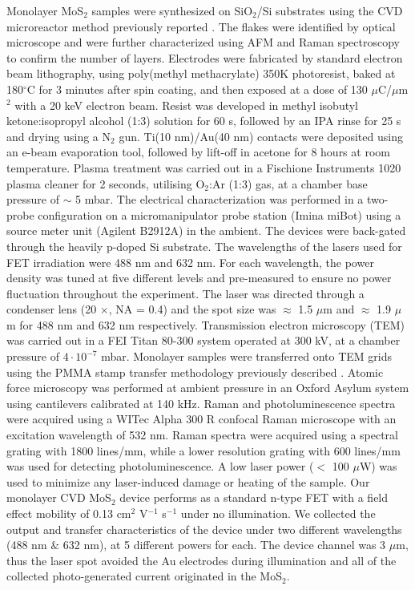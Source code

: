\documentclass[%
 reprint,
superscriptaddress,
 amsmath,amssymb,
 aps,
prb,
]{revtex4-1}
\begin{document}
\indent Monolayer MoS$_2$ samples were synthesized on SiO$_2$/Si substrates using the CVD microreactor method previously reported \cite{Maria2014}. The flakes were identified by optical microscope and were further characterized using AFM and Raman spectroscopy to confirm the number of layers. Electrodes were fabricated by standard electron beam lithography, using poly(methyl methacrylate) 350K photoresist, baked at 180$^{\circ}$C for 3 minutes after spin coating, and then exposed at a dose of 130 $\mu$C/$\mu$m$^2$ with a 20 keV electron beam. Resist was developed in methyl isobutyl ketone:isopropyl alcohol (1:3) solution for 60 s, followed by an IPA rinse for 25 s and drying using a N$_2$ gun. Ti(10 nm)/Au(40 nm) contacts were deposited using an e-beam evaporation tool, followed by lift-off in acetone for 8 hours at room temperature. Plasma treatment was carried out in a Fischione Instruments 1020 plasma cleaner for 2 seconds, utilising O$_2$:Ar (1:3) gas, at a chamber base pressure of $\sim$ 5 mbar. The electrical characterization was performed in a two-probe configuration on a micromanipulator probe station (Imina miBot) using a source meter unit (Agilent B2912A) in the ambient. The devices were back-gated through the heavily p-doped Si substrate. The wavelengths of the lasers used for FET irradiation were 488 nm and 632 nm. For each wavelength, the power density was tuned at five different levels and pre-measured to ensure no power fluctuation throughout the experiment. The laser was directed through a condenser lens (20 $\times$, NA = 0.4) and the spot size was $\approx$ 1.5 $\mu$m and $\approx$ 1.9 $\mu$m for 488 nm and 632 nm respectively. Transmission electron microscopy (TEM) was carried out in a FEI Titan 80-300 system operated at 300 kV, at a chamber pressure of $4 \cdot 10^{-7}$ mbar. Monolayer samples were transferred onto TEM grids using the PMMA stamp transfer methodology previously described \citep{bie2011site}. Atomic force microscopy was performed at ambient pressure in an Oxford Asylum system using cantilevers calibrated at 140 kHz. Raman and photoluminescence spectra were acquired using a WITec Alpha 300 R confocal Raman microscope with an excitation wavelength of 532 nm. Raman spectra were acquired using a spectral grating with 1800 lines/mm, while a lower resolution grating with 600 lines/mm was used for detecting photoluminescence. A low laser power ($<$ 100 $\mu$W) was used to minimize any laser-induced damage or heating of the sample. \newline
\indent Our monolayer CVD MoS$_2$ device performs as a standard
n-type FET with a field effect mobility of 0.13 cm$^2$ V$^{-1}$ s$^{-1}$ under no illumination. We collected the output and transfer characteristics of the device under two different wavelengths (488 nm $\&$ 632 nm), at 5 different powers for each. The device channel was 3 $\mu$m, thus the laser spot avoided the Au electrodes during illumination and all of the collected photo-generated current originated in the MoS$_2$.\\
\end{document}
